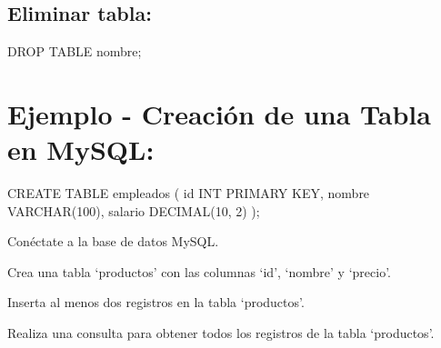 \documentclass[
  a4paper,
  onepage,
  openany]{scrreprt}
\newenvironment{Shaded}{\begin{snugshade}}{\end{snugshade}}
\newcommand{\DataTypeTok}[1]{\textcolor[rgb]{0.68,0.00,0.00}{#1}}
\newcommand{\DecValTok}[1]{\textcolor[rgb]{0.68,0.00,0.00}{#1}}
\newcommand{\KeywordTok}[1]{\textcolor[rgb]{0.00,0.23,0.31}{#1}}
\newcommand{\NormalTok}[1]{\textcolor[rgb]{0.00,0.23,0.31}{#1}}
\begin{document}
\hypertarget{eliminar-tabla-1}{%
\subsection{Eliminar tabla:}\label{eliminar-tabla-1}}

\begin{Shaded}
\begin{Highlighting}[]
\KeywordTok{DROP} \KeywordTok{TABLE}\NormalTok{ nombre;}
\end{Highlighting}
\end{Shaded}

\hypertarget{ejemplo---creaciuxf3n-de-una-tabla-en-mysql-1}{%
\section{Ejemplo - Creación de una Tabla en
MySQL:}\label{ejemplo---creaciuxf3n-de-una-tabla-en-mysql-1}}

\begin{Shaded}
\begin{Highlighting}[]
\KeywordTok{CREATE} \KeywordTok{TABLE}\NormalTok{ empleados (}
    \KeywordTok{id} \DataTypeTok{INT} \KeywordTok{PRIMARY} \KeywordTok{KEY}\NormalTok{,}
\NormalTok{    nombre }\DataTypeTok{VARCHAR}\NormalTok{(}\DecValTok{100}\NormalTok{),}
\NormalTok{    salario }\DataTypeTok{DECIMAL}\NormalTok{(}\DecValTok{10}\NormalTok{, }\DecValTok{2}\NormalTok{)}
\NormalTok{);}
\end{Highlighting}
\end{Shaded}

\begin{tcolorbox}[enhanced jigsaw, breakable, opacityback=0, toptitle=1mm, coltitle=black, toprule=.15mm, rightrule=.15mm, colframe=quarto-callout-important-color-frame, opacitybacktitle=0.6, arc=.35mm, title=\textcolor{quarto-callout-important-color}{\faExclamation}\hspace{0.5em}{Actividad Práctica:}, titlerule=0mm, colbacktitle=quarto-callout-important-color!10!white, bottomtitle=1mm, bottomrule=.15mm, colback=white, left=2mm, leftrule=.75mm]

Conéctate a la base de datos MySQL.

Crea una tabla `productos' con las columnas `id', `nombre' y `precio'.

Inserta al menos dos registros en la tabla `productos'.

Realiza una consulta para obtener todos los registros de la tabla
`productos'.

\end{tcolorbox}
\end{document}
